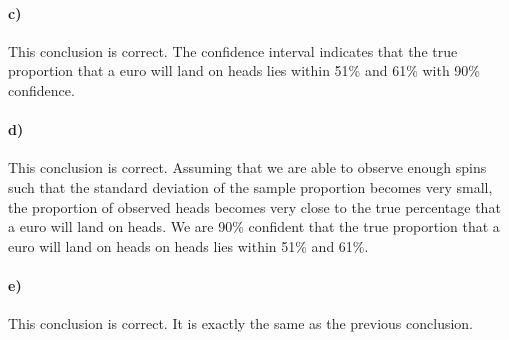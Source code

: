 \documentclass[12pt]{article}
\begin{document}
\paragraph{c)}

This conclusion is correct. The confidence interval indicates that the true proportion that a euro
will land on heads lies within 51\% and 61\% with 90\% confidence.

\paragraph{d)}

This conclusion is correct. Assuming that we are able to observe enough spins such that the standard deviation
of the sample proportion becomes very small, the proportion of observed heads becomes very close to the
true percentage that a euro will land on heads. We are 90\% confident that the true proportion that a euro
will land on heads on heads lies within 51\% and 61\%.

\paragraph{e)}

This conclusion is correct. It is exactly the same as the previous conclusion.
\end{document}
